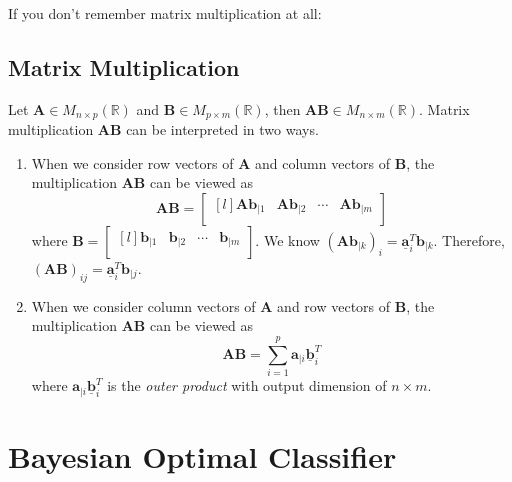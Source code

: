 \documentclass[12pt]{article}
\newcommand{\ul}[1]{\underline{#1}}
\theoremstyle{definition}
\begin{document}
\noindent If you don't remember matrix multiplication at all:

\subsection{Matrix Multiplication} 
Let $\bm{A}\in M_{n\times p}(\mathbb{R})$ and $\bm{B}\in M_{p\times m}(\mathbb{R})$, then $\bm{A}\bm{B}\in M_{n\times m}(\mathbb{R})$. Matrix multiplication $\bm{AB}$ can be interpreted in two ways.

\begin{enumerate}[label=\theenumi)]
    \item When we consider row vectors of $\bm{A}$ and column vectors of $\bm{B}$, the multiplication $\bm{AB}$ can be viewed as
        \begin{equation}
            \bm{A}\bm{B} =  \begin{bmatrix*}[l]
            \bm{Ab}_{|1} & \bm{Ab}_{|2} & \cdots & \bm{Ab}_{|m}\\
            \end{bmatrix*}
        \end{equation}
    where $\bm{B}=\begin{bmatrix*}[l]
        \bm{b}_{|1} & \bm{b}_{|2} & \cdots & \bm{b}_{|m}\\
        \end{bmatrix*}$. We know $(\bm{Ab}_{|k})_i=\bm{\ul{a}}_i^T\bm{b}_{|k}$. Therefore, $(\bm{AB})_{ij}=\bm{\ul{a}}_i^T\bm{b}_{|j}$.
        
    \item When we consider column vectors of $\bm{A}$ and row vectors of $\bm{B}$, the multiplication $\bm{AB}$ can be viewed as 
    \begin{equation}\label{eq:mmult_2}
        \bm{AB}=\sum_{i=1}^{p}\bm{a}_{|i}\bm{\ul{b}}_i^T
    \end{equation}
    where $\bm{a}_{|i}\bm{\ul{b}}_i^T$ is the \emph{outer product} with output dimension of $n\times m$.
\end{enumerate} 


\section{Bayesian Optimal Classifier}
\end{document}
